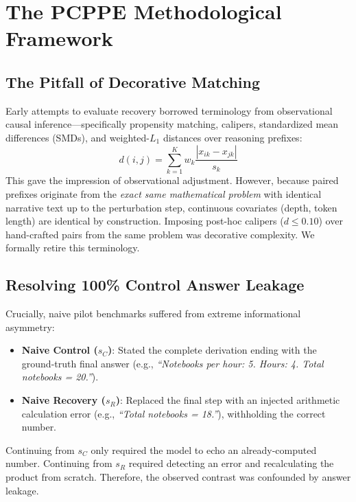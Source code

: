 \documentclass[conference]{IEEEtran}
\begin{document}
\section{The PCPPE Methodological Framework}

\subsection{The Pitfall of Decorative Matching}
Early attempts to evaluate recovery borrowed terminology from observational causal inference—specifically propensity matching, calipers, standardized mean differences (SMDs), and weighted-$L_1$ distances over reasoning prefixes:
\begin{equation}
d(i, j) = \sum_{k=1}^K w_k \frac{|x_{ik} - x_{jk}|}{s_k}
\end{equation}
This gave the impression of observational adjustment. However, because paired prefixes originate from the \textit{exact same mathematical problem} with identical narrative text up to the perturbation step, continuous covariates (depth, token length) are identical by construction. Imposing post-hoc calipers ($d \le 0.10$) over hand-crafted pairs from the same problem was decorative complexity. We formally retire this terminology.

\subsection{Resolving 100\% Control Answer Leakage}
Crucially, naive pilot benchmarks suffered from extreme informational asymmetry:
\begin{itemize}
    \item \textbf{Naive Control ($s_C$)}: Stated the complete derivation ending with the ground-truth final answer (e.g., \textit{``Notebooks per hour: 5. Hours: 4. Total notebooks = 20.''}).
    \item \textbf{Naive Recovery ($s_R$)}: Replaced the final step with an injected arithmetic calculation error (e.g., \textit{``Total notebooks = 18.''}), withholding the correct number.
\end{itemize}
Continuing from $s_C$ only required the model to echo an already-computed number. Continuing from $s_R$ required detecting an error and recalculating the product from scratch. Therefore, the observed contrast was confounded by answer leakage.
\end{document}
